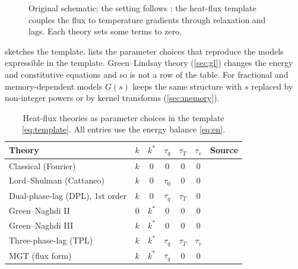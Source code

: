 \begin{figure}[t!]\centering\small

\caption{Original schematic; the setting follows \citep{Biot1956}: the heat-flux template couples the flux to temperature gradients through relaxation and lags. Each theory sets some terms to zero.}\label{fig:template}
\end{figure}

 sketches the template.  lists the parameter choices that reproduce the models expressible in the template. Green--Lindsay theory (\cref{sec:gl}) changes the energy and constitutive equations and so is not a row of the table. For fractional and memory-dependent models $G(s)$ keeps the same structure with $s$ replaced by non-integer powers or by kernel transforms (\cref{sec:memory}).

\begin{table}[ht]\centering\small
\caption{Heat-flux theories as parameter choices in the template \eqref{eq:template}. All entries use the energy balance \eqref{eq:en}.}\label{tab:param}
\begin{tabular}{@{}lccccc l@{}}\toprule
Theory & $k$ & $k^*$ & $\tau_q$ & $\tau_T$ & $\tau_v$ & Source\\\midrule
Classical (Fourier) & $k$ & 0 & 0 & 0 & 0 & \citep{Biot1956}\\
Lord--Shulman (Cattaneo) & $k$ & 0 & $\tau_0$ & 0 & 0 & \citep{Lord1967,Cattaneo1948,Vernotte1958}\\
Dual-phase-lag (DPL), 1st order & $k$ & 0 & $\tau_q$ & $\tau_T$ & 0 & \citep{Tzou1995,Tzou1997}\\
Green--Naghdi II & 0 & $k^*$ & 0 & 0 & 0 & \citep{Green1993}\\
Green--Naghdi III & $k$ & $k^*$ & 0 & 0 & 0 & \citep{Green1991}\\
Three-phase-lag (TPL) & $k$ & $k^*$ & $\tau_q$ & $\tau_T$ & $\tau_v$ & \citep{RoyChoudhuri2007}\\
MGT (flux form) & $k$ & $k^*$ & $\tau_q$ & 0 & 0 & \citep{Quintanilla2019}\\\bottomrule
\end{tabular}
\end{table}

